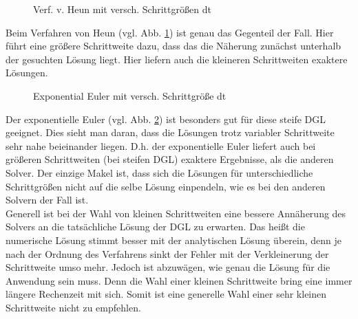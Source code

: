 \documentclass[conference]{IEEEtran}
\begin{document}
\begin{figure}[h!]
  	\centering
    \scalebox{.6}{}
    \caption{Verf. v. Heun mit versch. Schrittgrößen dt}
    \label{fig:heun}
\end{figure}
Beim Verfahren von Heun (vgl. Abb. \ref{fig:heun}) ist genau das Gegenteil der Fall. Hier führt eine größere Schrittweite dazu, dass das die Näherung zunächst unterhalb der gesuchten Lösung liegt. Hier liefern auch die kleineren Schrittweiten exaktere Lösungen.

\begin{figure}[h!]
  	\centering
    \scalebox{.6}{}
    \caption{Exponential Euler mit versch. Schrittgröße dt}
    \label{fig:expEuler}
\end{figure}
Der exponentielle Euler (vgl. Abb. \ref{fig:expEuler}) ist besonders gut für diese steife DGL geeignet. Dies sieht man daran, dass die Lösungen trotz variabler Schrittweite sehr nahe beieinander liegen. D.h. der exponentielle Euler liefert auch bei größeren Schrittweiten (bei steifen DGL) exaktere Ergebnisse, als die anderen Solver. Der einzige Makel ist, dass sich die Lösungen für unterschiedliche Schrittgrößen nicht auf die selbe Lösung einpendeln, wie es bei den anderen Solvern der Fall ist.\\

Generell ist bei der Wahl von kleinen Schrittweiten eine bessere Annäherung des Solvers an die tatsächliche Lösung der DGL zu erwarten. Das heißt die numerische Lösung stimmt besser mit der analytischen Lösung überein, denn je nach der Ordnung des Verfahrens sinkt der Fehler mit der Verkleinerung der Schrittweite umso mehr. Jedoch ist abzuwägen, wie genau die Lösung für die Anwendung sein muss. Denn die Wahl einer kleinen Schrittweite bring eine immer längere Rechenzeit mit sich. Somit ist eine generelle Wahl einer sehr kleinen Schrittweite nicht zu empfehlen.\\
\end{document}

